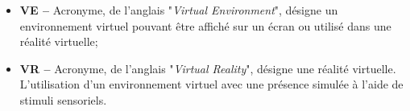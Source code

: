 \begin{itemize}
	\item \textbf{VE --} Acronyme, de l'anglais "\textit{Virtual Environment}", désigne un environnement virtuel pouvant être affiché sur un écran ou utilisé dans une réalité virtuelle;
	
	\item \textbf{VR --} Acronyme, de l'anglais "\textit{Virtual Reality}", désigne une réalité virtuelle. L'utilisation d'un environnement virtuel avec une présence simulée à l'aide de stimuli sensoriels.
	
\end{itemize}

